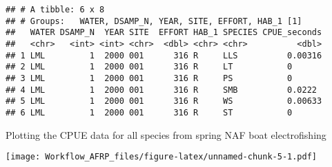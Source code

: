 \documentclass[
]{article}
\newenvironment{Shaded}{\begin{snugshade}}{\end{snugshade}}
\newcommand{\DataTypeTok}[1]{\textcolor[rgb]{0.13,0.29,0.53}{#1}}
\newcommand{\DecValTok}[1]{\textcolor[rgb]{0.00,0.00,0.81}{#1}}
\newcommand{\FloatTok}[1]{\textcolor[rgb]{0.00,0.00,0.81}{#1}}
\newcommand{\KeywordTok}[1]{\textcolor[rgb]{0.13,0.29,0.53}{\textbf{#1}}}
\newcommand{\NormalTok}[1]{#1}
\newcommand{\OperatorTok}[1]{\textcolor[rgb]{0.81,0.36,0.00}{\textbf{#1}}}
\newcommand{\StringTok}[1]{\textcolor[rgb]{0.31,0.60,0.02}{#1}}
\begin{document}
\begin{Shaded}
\end{Shaded}

\begin{verbatim}
## # A tibble: 6 x 8
## # Groups:   WATER, DSAMP_N, YEAR, SITE, EFFORT, HAB_1 [1]
##   WATER DSAMP_N  YEAR SITE  EFFORT HAB_1 SPECIES CPUE_seconds
##   <chr>   <int> <int> <chr>  <dbl> <chr> <chr>          <dbl>
## 1 LML         1  2000 001      316 R     LLS          0.00316
## 2 LML         1  2000 001      316 R     LT           0      
## 3 LML         1  2000 001      316 R     PS           0      
## 4 LML         1  2000 001      316 R     SMB          0.0222 
## 5 LML         1  2000 001      316 R     WS           0.00633
## 6 LML         1  2000 001      316 R     ST           0
\end{verbatim}

Plotting the CPUE data for all species from spring NAF boat
electrofishing

\begin{Shaded}
\end{Shaded}

\texttt{[image: Workflow\_AFRP\_files/figure-latex/unnamed-chunk-5-1.pdf]}
\end{document}

